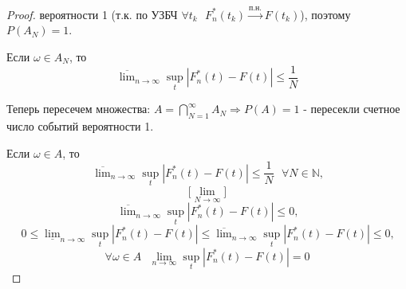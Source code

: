 \begin{proof}
    вероятности 1 (т.к. по УЗБЧ $\forall t_k \textrm{ } F_{n}^{*}(t_k) \xrightarrow{\textrm{п.н.}} F(t_k)$), поэтому $P(A_N) = 1$.
    
    Если $\omega \in A_N$, то
    $$\overline{\lim}_{n \to \infty} \sup_{t}|F_{n}^{*}(t) - F(t)| \leq \frac{1}{N}$$
    
    Теперь пересечем множества: $A = \bigcap_{N = 1}^{\infty}A_N \Rightarrow P(A) = 1$ - пересекли счетное число событий вероятности 1.
    
    Если $\omega \in A$, то
    $$\overline{\lim}_{n \to \infty} \sup_{t}|F_{n}^{*}(t) - F(t)| \leq \frac{1}{N} \textrm{ } \forall N \in \mathbb{N} \textrm{,}$$
    $$\Big[ \lim_{N \to \infty} \Big]$$
    $$\overline{\lim}_{n \to \infty} \sup_{t}|F_{n}^{*}(t) - F(t)| \leq 0 \textrm{,}$$
    $$0 \leq \underline{\lim}_{n \to \infty} \sup_{t}|F_{n}^{*}(t) - F(t)| \leq \overline{\lim}_{n \to \infty} \sup_{t}|F_{n}^{*}(t) - F(t)| \leq 0 \textrm{,}$$
    $$\forall \omega \in A \textrm{ } \lim_{n \to \infty} \sup_{t}|F_{n}^{*}(t) - F(t)| = 0$$
\end{proof}
